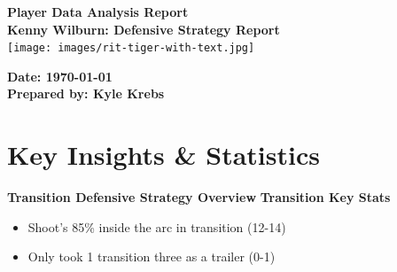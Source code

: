 \documentclass[a4paper,12pt]{article}
\begin{document}
\begin{titlepage}
    \centering
    {\Huge \textbf{Player Data Analysis Report}}\\[1.5cm]
    
    {\Large \textbf{Kenny Wilburn: Defensive Strategy Report}}\\[2cm]
    
    \texttt{[image: images/rit-tiger-with-text.jpg]} %
    
    \vfill
    
    \textbf{Date: \today}\\[1cm]
    \textbf{Prepared by: Kyle Krebs}
\end{titlepage}

\section*{Key Insights \& Statistics}

\vspace{1em}

\noindent \textbf{Transition Defensive Strategy Overview}
\hfill \textbf{Transition Key Stats}
\begin{table}[H]
    \flushleft
    \hfill
    \begin{minipage}[c]{0.5\textwidth}
        {\small
        \begin{itemize}[rightmargin= 0em, label=\textbullet]
            \item Shoot’s 85\% inside the arc in transition (12-14)\vspace{.5em}

            \item Only took 1 transition three as a trailer (0-1)\vspace{.5em}

        \end{itemize}
        }
    \end{minipage}
    
\end{table}
\end{document}
